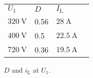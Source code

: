 \begin{solutiontable}[htb]
    \centering  %
    \begin{tabular}{llll}
        \toprule
        
        $U_\mathrm{1}$ & $D$ & $I_\mathrm{L}$ \\ 
        $\SI{320}{\volt}$ & 0.56 & $\SI{28}{\ampere}$ \\ 
        $\SI{400}{\volt}$ & 0.5 & $\SI{22.5}{\ampere}$ \\ 
        $\SI{720}{\volt}$ & 0.36 & $\SI{19.5}{\ampere}$ \\ 
        \bottomrule
    \end{tabular}
    \caption{$D$ and $i_\mathrm{L}$ at $U_\mathrm{1}$.}
    \label{table:InductorCurrentDutyCycle}
\end{solutiontable}
